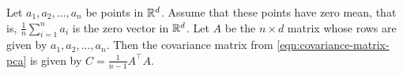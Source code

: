 Let \(a_1, a_2, \dots, a_n\) be points in \(\mathbb{R}^d\).
Assume that these points have zero mean, that is, \(\frac{1}{n}\sum_{i=1}^{n} a_i\) is the zero vector in \(\mathbb{R}^d\).
Let \(A\) be the \(n \times d\) matrix whose rows are given by \(a_1, a_2, \dots, a_n\).
Then the covariance matrix from \cref{eqn:covariance-matrix-pca} is given by \(C = \frac{1}{n-1} A^\top A\).



